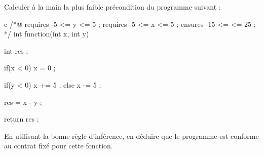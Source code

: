 

Calculer à la main la plus faible précondition du programme suivant :


\begin{CodeBlock}{c}
/*@
  requires -5 <= y <= 5 ;
  requires -5 <= x <= 5 ;
  ensures  -15 <= \result <= 25 ;
*/
int function(int x, int y){
  int res ;

  if(x < 0){
    x = 0 ;
  }

  if(y < 0){
    x += 5 ;
  } else {
    x -= 5 ;
  }

  res = x - y ;

  return res ;
}
\end{CodeBlock}



En utilisant la bonne règle d'inférence, en déduire que le programme est
conforme au contrat fixé pour cette fonction.

